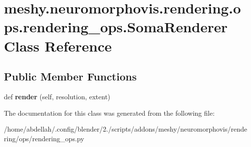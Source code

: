 \hypertarget{classmeshy_1_1neuromorphovis_1_1rendering_1_1ops_1_1rendering__ops_1_1SomaRenderer}{}\section{meshy.\+neuromorphovis.\+rendering.\+ops.\+rendering\+\_\+ops.\+Soma\+Renderer Class Reference}
\label{classmeshy_1_1neuromorphovis_1_1rendering_1_1ops_1_1rendering__ops_1_1SomaRenderer}
\subsection*{Public Member Functions}
\begin{DoxyCompactItemize}
\item 
def {\bfseries render} (self, resolution, extent)\hypertarget{classmeshy_1_1neuromorphovis_1_1rendering_1_1ops_1_1rendering__ops_1_1SomaRenderer_aa5a069241ec648f8327b250c682c69e9}{}\label{classmeshy_1_1neuromorphovis_1_1rendering_1_1ops_1_1rendering__ops_1_1SomaRenderer_aa5a069241ec648f8327b250c682c69e9}

\end{DoxyCompactItemize}


The documentation for this class was generated from the following file\+:\begin{DoxyCompactItemize}
\item 
/home/abdellah/.\+config/blender/2./scripts/addons/meshy/neuromorphovis/rendering/ops/rendering\+\_\+ops.\+py\end{DoxyCompactItemize}
